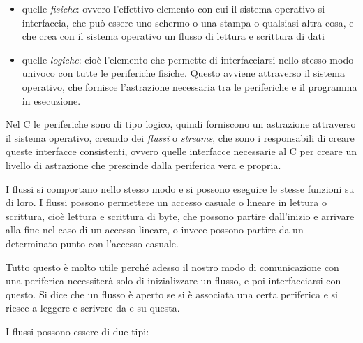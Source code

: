 \documentclass[
  paper=a4,
  oneside  ,captions=tableheading
]{scrbook}
\providecommand{\tightlist}{%
  \setlength{\itemsep}{0pt}\setlength{\parskip}{0pt}}
\begin{document}
\begin{itemize}
\tightlist
\item
  quelle \emph{fisiche}: ovvero l'effettivo elemento con cui il sistema
  operativo si interfaccia, che può essere uno schermo o una stampa o
  qualsiasi altra cosa, e che crea con il sistema operativo un flusso di
  lettura e scrittura di dati
\item
  quelle \emph{logiche}: cioè l'elemento che permette di interfacciarsi
  nello stesso modo univoco con tutte le periferiche fisiche. Questo
  avviene attraverso il sistema operativo, che fornisce l'astrazione
  necessaria tra le periferiche e il programma in esecuzione.
\end{itemize}

Nel C le periferiche sono di tipo logico, quindi forniscono un
astrazione attraverso il sistema operativo, creando dei \emph{flussi} o
\emph{streams}, che sono i responsabili di creare queste interfacce
consistenti, ovvero quelle interfacce necessarie al C per creare un
livello di astrazione che prescinde dalla periferica vera e propria.

I flussi si comportano nello stesso modo e si possono eseguire le stesse
funzioni su di loro. I flussi possono permettere un accesso casuale o
lineare in lettura o scrittura, cioè lettura e scrittura di byte, che
possono partire dall'inizio e arrivare alla fine nel caso di un accesso
lineare, o invece possono partire da un determinato punto con l'accesso
casuale.

Tutto questo è molto utile perché adesso il nostro modo di comunicazione
con una periferica necessiterà solo di inizializzare un flusso, e poi
interfacciarsi con questo. Si dice che un flusso è aperto se si è
associata una certa periferica e si riesce a leggere e scrivere da e su
questa.

I flussi possono essere di due tipi:
\end{document}
